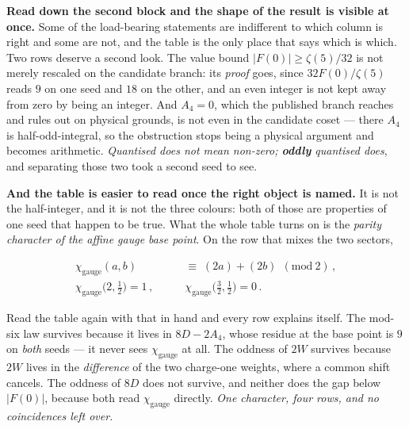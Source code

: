 \documentclass[11pt,a4paper]{article}
\newenvironment{keyeq}
  {\begin{center}\setlength{\fboxsep}{9pt}\setlength{\fboxrule}{0.8pt}%
   \begin{lrbox}{\keyeqbox}\begin{minipage}{0.88\textwidth}}
  {\end{minipage}\end{lrbox}%
   \fcolorbox{hdrblue!55}{hdrblue!6}{\usebox{\keyeqbox}}\end{center}}
\begin{document}
\begin{itemize}
\noindent \textbf{Read down the second block and the shape of the result is visible at once.} Some
of the load-bearing statements are indifferent to which column is right and some are not, and the
table is the only place that says which is which. Two rows deserve a second look. The value bound
$|F(0)|\ge\zeta(5)/32$ is not merely rescaled on the candidate branch: its \emph{proof} goes, since
$32F(0)/\zeta(5)$ reads $9$ on one seed and $18$ on the other, and an even integer is not kept away
from zero by being an integer. And $A_4=0$, which the published branch reaches and rules out on
physical grounds, is not even in the candidate coset --- there $A_4$ is half-odd-integral, so the
obstruction stops being a physical argument and becomes arithmetic. \emph{Quantised does not mean
non-zero; \textbf{oddly} quantised does}, and separating those two took a second seed to see.

\noindent \textbf{And the table is easier to read once the right object is named.} It is not the
half-integer, and it is not the three colours: both of those are properties of one seed that happen
to be true. What the whole table turns on is the \emph{parity character of the affine gauge base
point}. On the row that mixes the two sectors,
\begin{keyeq}
\begin{equation}\label{eq:chigauge}
  \begin{aligned}
    \chi_{\mathrm{gauge}}(a,b)\;&\equiv\;(2a)+(2b)\ \ (\mathrm{mod}\ 2)\,,\\[2pt]
    \chi_{\mathrm{gauge}}\bigl(2,\tfrac12\bigr)=1\,,\qquad
    &\chi_{\mathrm{gauge}}\bigl(\tfrac32,\tfrac12\bigr)=0\,.
  \end{aligned}
\end{equation}
\end{keyeq}
\noindent Read the table again with that in hand and every row explains itself. The mod-six law
survives because it lives in $8D-2A_4$, whose residue at the base point is $9$ on \emph{both} seeds
--- it never sees $\chi_{\mathrm{gauge}}$ at all. The oddness of $2W$ survives because $2W$ lives in
the \emph{difference} of the two charge-one weights, where a common shift cancels. The oddness of
$8D$ does not survive, and neither does the gap below $|F(0)|$, because both read
$\chi_{\mathrm{gauge}}$ directly. \emph{One character, four rows, and no coincidences left over.}


\end{itemize}
\end{document}
